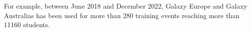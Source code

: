 For example, between June 2018 and December 2022, Galaxy Europe and Galaxy Australias has been used for more than 280 training events reaching more than 11160 students.